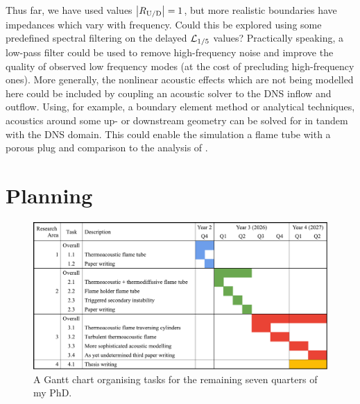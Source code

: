 Thus far, we have used values $\abs{R_{\mathrm{U}/\mathrm{D}}} = 1$, but more realistic boundaries have impedances which vary with frequency. Could this be explored using some predefined spectral filtering on the delayed $\mathcal{L}_{1/5}$ values? Practically speaking, a low-pass filter could be used to remove high-frequency noise and improve the quality of observed low frequency modes (at the cost of precluding high-frequency ones). More generally, the nonlinear acoustic effects which are not being modelled here could be included by coupling an acoustic solver to the DNS inflow and outflow. Using, for example, a boundary element method or analytical techniques, acoustics around some up- or downstream geometry can be solved for in tandem with the DNS domain. This could enable the simulation a flame tube with a porous plug and comparison to the analysis of \cite{gaton-perez2025MitigationThermoacousticInstabilities}.



\section{Planning}

\begin{figure}[t]
\centering
\includegraphics[scale=0.5]{assets/graphs/2YR_Gantt.pdf}
\caption{A Gantt chart organising tasks for the remaining seven quarters of my PhD.}
\label{fig:gantt}
\end{figure}

